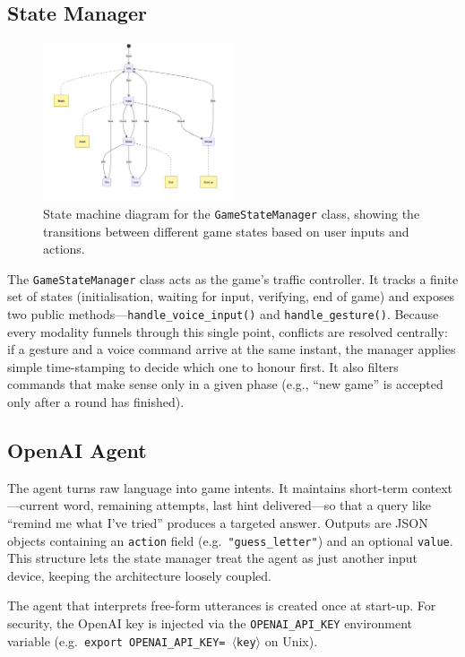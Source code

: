 \subsection{State Manager}
\begin{figure}
    \centering
    \includegraphics[width=0.5\textwidth]{./images/game_state_manager_state_machine.png}
    \caption{State machine diagram for the \texttt{GameStateManager} class, showing the transitions between different game states based on user inputs and actions.}
    \label{fig:state_machine}
\end{figure}
The \texttt{GameStateManager} class acts as the game’s traffic controller.  
It tracks a finite set of states (initialisation, waiting for input, verifying, end of game) and exposes two public methods—\texttt{handle\_voice\_input()} and \texttt{handle\_gesture()}.  
Because every modality funnels through this single point, conflicts are resolved centrally: if a gesture and a voice command arrive at the same instant, the manager applies simple time-stamping to decide which one to honour first.  
It also filters commands that make sense only in a given phase (e.g., “new game” is accepted only after a round has finished).

\subsection{OpenAI Agent}

The agent turns raw language into game intents.  
It maintains short-term context—current word, remaining attempts, last hint delivered—so that a query like “remind me what I’ve tried” produces a targeted answer.  
Outputs are JSON objects containing an \texttt{action} field (e.g.\ \texttt{"guess\_letter"}) and an optional \texttt{value}.  
This structure lets the state manager treat the agent as just another input device, keeping the architecture loosely coupled.

The agent that interprets free-form utterances is created once at start-up.
For security, the OpenAI key is injected via the \texttt{OPENAI\_API\_KEY} environment
variable (e.g.\ \texttt{export OPENAI\_API\_KEY=\,$\langle$key$\rangle$} on Unix).

